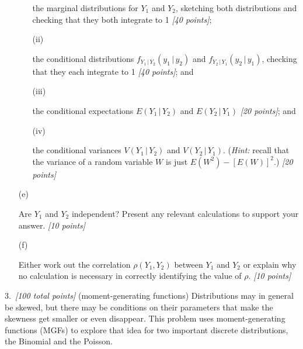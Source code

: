 \documentclass[12pt]{article}
\newcommand{\given}{\, | \,}
\begin{document}
\begin{itemize}
\begin{itemize}
the marginal distributions for $Y_1$ and $Y_2$, sketching both distributions and checking that they both integrate to 1 \textit{[40 points]};

\item[(ii)]%

the conditional distributions $f_{ Y_1 \given Y_2 } ( y_1 \given y_2 )$ and $f_{ Y_2 \given Y_1 } ( y_2 \given y_1 )$, checking that they each integrate to 1 \textit{[40 points]}; and 

\item[(iii)]%

the conditional expectations $E ( Y_1 \given Y_2 )$ and $E ( Y_2 \given Y_1 )$ \textit{[20 points]}; and

\item[(iv)]%

the conditional variances $V ( Y_1 \given Y_2 )$ and $V ( Y_2 \given Y_1 )$. (\textit{Hint:} recall that the variance of a random variable $W$ is just $E \left( W^2 \right) - [ E ( W ) ]^2$.) \textit{[20 points]}

\end{itemize}

\item[(e)]%

Are $Y_1$ and $Y_2$ independent? Present any relevant calculations to support your answer. \textit{[10 points]}

\item[(f)]%

Either work out the correlation $\rho ( Y_1, Y_2 )$ between $Y_1$ and $Y_2$ or explain why no calculation is necessary in correctly identifying the value of $\rho$. \textit{[10 points]}

\end{itemize}

3.~\textit{[100 total points]} (moment-generating functions) Distributions may in general be skewed, but there may be conditions on their parameters that make the skewness get smaller or even disappear. This problem uses moment-generating functions (MGFs) to explore that idea for two important discrete distributions, the Binomial and the Poisson.
\end{document}
